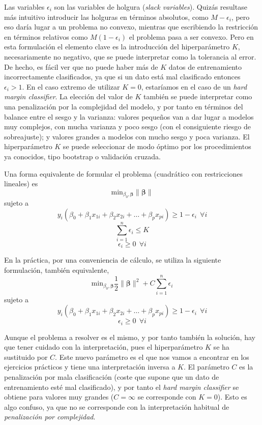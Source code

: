 \documentclass[
  spanish,
]{book}
\theoremstyle{break}
\theoremstyle{definition}
\theoremstyle{definition}
\theoremstyle{definition}
\theoremstyle{remark}
\begin{document}
Las variables \(\epsilon_i\) son las variables de holgura (\emph{slack variables}). Quizás resultase más intuitivo introducir las holguras en términos absolutos, como \(M -\epsilon_i\), pero eso daría lugar a un problema no convexo, mientras que escribiendo la restricción en términos relativos como \(M(1 - \epsilon_i)\) el problema pasa a ser convexo. Pero en esta formulación el elemento clave es la introducción del hiperparámetro \(K\), necesariamente no negativo, que se puede interpretar como la tolerancia al error. De hecho, es fácil ver que no puede haber más de \(K\) datos de entrenamiento incorrectamente clasificados, ya que si un dato está mal clasificado entonces \(\epsilon_i > 1\). En el caso extremo de utilizar \(K = 0\), estaríamos en el caso de un \emph{hard margin classifier}. La elección del valor de \(K\) también se puede interpretar como una penalización por la complejidad del modelo, y por tanto en términos del balance entre el sesgo y la varianza: valores pequeños van a dar lugar a modelos muy complejos, con mucha varianza y poco sesgo (con el consiguiente riesgo de sobreajuste); y valores grandes a modelos con mucho sesgo y poca varianza. El hiperparámetro \(K\) se puede seleccionar de modo óptimo por los procedimientos ya conocidos, tipo bootstrap o validación cruzada.

Una forma equivalente de formular el problema (cuadrático con restricciones lineales) es
\[\mbox{min}_{\beta_0, \boldsymbol{\beta}} \lVert \boldsymbol{\beta} \rVert\]
sujeto a
\[ y_i(\beta_0 + \beta_1 x_{1i} + \beta_2 x_{2i} + \ldots + \beta_p x_{pi}) \ge 1 - \epsilon_i \ \ \forall i\]
\[\sum_{i=1}^n \epsilon_i \le K\]
\[\epsilon_i \ge 0 \ \ \forall i\]

En la práctica, por una conveniencia de cálculo, se utiliza la siguiente formulación, también equivalente,
\[\mbox{min}_{\beta_0, \boldsymbol{\beta}} \frac{1}{2}\lVert \boldsymbol{\beta} \rVert^2 + C \sum_{i=1}^n \epsilon_i\]
sujeto a
\[ y_i(\beta_0 + \beta_1 x_{1i} + \beta_2 x_{2i} + \ldots + \beta_p x_{pi}) \ge 1 - \epsilon_i \ \ \forall i\]
\[\epsilon_i \ge 0 \ \ \forall i\]

Aunque el problema a resolver es el mismo, y por tanto también la solución, hay que tener cuidado con la interpretación, pues el hiperparámetro \(K\) se ha sustituido por \(C\). Este nuevo parámetro es el que nos vamos a encontrar en los ejercicios prácticos y tiene una interpretación inversa a \(K\). El parámetro \(C\) es la penalización por mala clasificación (coste que supone que un dato de entrenamiento esté mal clasificado), y por tanto el \emph{hard margin classifier} se obtiene para valores muy grandes (\(C = \infty\) se corresponde con \(K = 0\)). Esto es algo confuso, ya que no se corresponde con la interpretación habitual de \emph{penalización por complejidad}.
\end{document}
